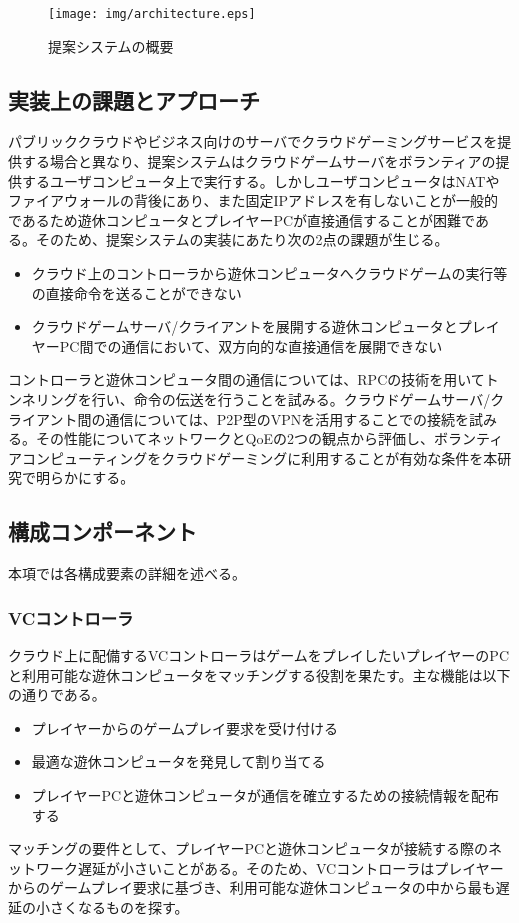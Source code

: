 \begin{figure*}[t]
    \centering
    \texttt{[image: img/architecture.eps]}
    \caption{提案システムの概要}
    \label{fig:arch}
\end{figure*}

\subsection{実装上の課題とアプローチ}
パブリッククラウドやビジネス向けのサーバでクラウドゲーミングサービスを提供する場合と異なり、提案システムはクラウドゲームサーバをボランティアの提供するユーザコンピュータ上で実行する。しかしユーザコンピュータはNATやファイアウォールの背後にあり、また固定IPアドレスを有しないことが一般的であるため遊休コンピュータとプレイヤーPCが直接通信することが困難である。そのため、提案システムの実装にあたり次の2点の課題が生じる。
\begin{itemize}
    \item クラウド上のコントローラから遊休コンピュータへクラウドゲームの実行等の直接命令を送ることができない
    \item クラウドゲームサーバ/クライアントを展開する遊休コンピュータとプレイヤーPC間での通信において、双方向的な直接通信を展開できない
\end{itemize}
コントローラと遊休コンピュータ間の通信については、RPCの技術を用いてトンネリングを行い、命令の伝送を行うことを試みる。クラウドゲームサーバ/クライアント間の通信については、P2P型のVPNを活用することでの接続を試みる。その性能についてネットワークとQoEの2つの観点から評価し、ボランティアコンピューティングをクラウドゲーミングに利用することが有効な条件を本研究で明らかにする。

\subsection{構成コンポーネント}
本項では各構成要素の詳細を述べる。

\subsubsection{VCコントローラ}
クラウド上に配備するVCコントローラはゲームをプレイしたいプレイヤーのPCと利用可能な遊休コンピュータをマッチングする役割を果たす。主な機能は以下の通りである。
\begin{itemize}
    \item プレイヤーからのゲームプレイ要求を受け付ける
    \item 最適な遊休コンピュータを発見して割り当てる
    \item プレイヤーPCと遊休コンピュータが通信を確立するための接続情報を配布する
\end{itemize}
マッチングの要件として、プレイヤーPCと遊休コンピュータが接続する際のネットワーク遅延が小さいことがある。そのため、VCコントローラはプレイヤーからのゲームプレイ要求に基づき、利用可能な遊休コンピュータの中から最も遅延の小さくなるものを探す。


